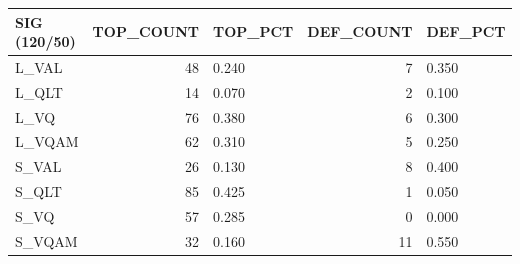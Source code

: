 \begin{tabular}{lrlrl}
\toprule
SIG (120/50) & TOP\_COUNT & TOP\_PCT & DEF\_COUNT & DEF\_PCT \\
\midrule
L\_VAL & 48 & 0.240 & 7 & 0.350 \\
L\_QLT & 14 & 0.070 & 2 & 0.100 \\
L\_VQ & 76 & 0.380 & 6 & 0.300 \\
L\_VQAM & 62 & 0.310 & 5 & 0.250 \\
S\_VAL & 26 & 0.130 & 8 & 0.400 \\
S\_QLT & 85 & 0.425 & 1 & 0.050 \\
S\_VQ & 57 & 0.285 & 0 & 0.000 \\
S\_VQAM & 32 & 0.160 & 11 & 0.550 \\
\bottomrule
\end{tabular}
